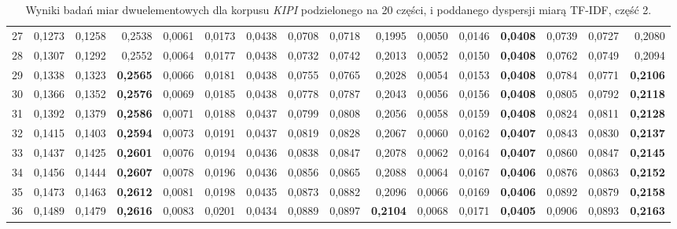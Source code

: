 \begin{table}[htp!]
\begin{adjustwidth}{-2cm}{}
\begin{tabular}{ l | *{15}{| r}}
27	&	0,1273	&	0,1258	&	0,2538	&	0,0061	&	0,0173	&	0,0438	&	0,0708	&	0,0718	&	0,1995	&	0,0050	&	0,0146	&	\textbf{0,0408}	&	0,0739	&	0,0727	&	0,2080	\\
28	&	0,1307	&	0,1292	&	0,2552	&	0,0064	&	0,0177	&	0,0438	&	0,0732	&	0,0742	&	0,2013	&	0,0052	&	0,0150	&	\textbf{0,0408}	&	0,0762	&	0,0749	&	0,2094	\\
29	&	0,1338	&	0,1323	&	\textbf{0,2565}	&	0,0066	&	0,0181	&	0,0438	&	0,0755	&	0,0765	&	0,2028	&	0,0054	&	0,0153	&	\textbf{0,0408}	&	0,0784	&	0,0771	&	\textbf{0,2106}	\\
30	&	0,1366	&	0,1352	&	\textbf{0,2576}	&	0,0069	&	0,0185	&	0,0438	&	0,0778	&	0,0787	&	0,2043	&	0,0056	&	0,0156	&	\textbf{0,0408}	&	0,0805	&	0,0792	&	\textbf{0,2118}	\\
31	&	0,1392	&	0,1379	&	\textbf{0,2586}	&	0,0071	&	0,0188	&	0,0437	&	0,0799	&	0,0808	&	0,2056	&	0,0058	&	0,0159	&	\textbf{0,0408}	&	0,0824	&	0,0811	&	\textbf{0,2128}	\\
32	&	0,1415	&	0,1403	&	\textbf{0,2594}	&	0,0073	&	0,0191	&	0,0437	&	0,0819	&	0,0828	&	0,2067	&	0,0060	&	0,0162	&	\textbf{0,0407}	&	0,0843	&	0,0830	&	\textbf{0,2137}	\\
33	&	0,1437	&	0,1425	&	\textbf{0,2601}	&	0,0076	&	0,0194	&	0,0436	&	0,0838	&	0,0847	&	0,2078	&	0,0062	&	0,0164	&	\textbf{0,0407}	&	0,0860	&	0,0847	&	\textbf{0,2145}	\\
34	&	0,1456	&	0,1444	&	\textbf{0,2607}	&	0,0078	&	0,0196	&	0,0436	&	0,0856	&	0,0865	&	0,2088	&	0,0064	&	0,0167	&	\textbf{0,0406}	&	0,0876	&	0,0863	&	\textbf{0,2152}	\\
35	&	0,1473	&	0,1463	&	\textbf{0,2612}	&	0,0081	&	0,0198	&	0,0435	&	0,0873	&	0,0882	&	0,2096	&	0,0066	&	0,0169	&	\textbf{0,0406}	&	0,0892	&	0,0879	&	\textbf{0,2158}	\\
36	&	0,1489	&	0,1479	&	\textbf{0,2616}	&	0,0083	&	0,0201	&	0,0434	&	0,0889	&	0,0897	&	\textbf{0,2104}	&	0,0068	&	0,0171	&	\textbf{0,0405}	&	0,0906	&	0,0893	&	\textbf{0,2163}	\\
	\bottomrule
\end{tabular}
 \end{adjustwidth}
\caption[Wyniki badań miar dwuelementowych dla korpusu \emph{KIPI} podzielonego na 20 części, i poddanego dyspersji miarą TF-IDF, część 2]{Wyniki badań miar dwuelementowych dla korpusu \emph{KIPI} podzielonego na 20 części, i poddanego dyspersji miarą TF-IDF, część 2.}
\label{KIPI_TFIDF_20_part_2}
\end{table}

